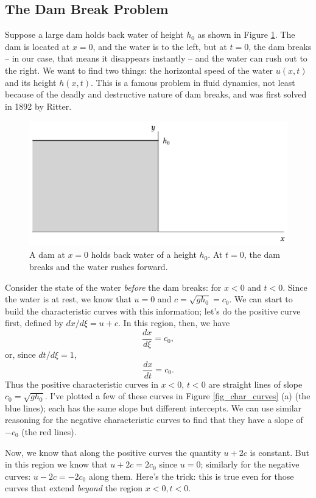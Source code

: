 \subsection{The Dam Break Problem}

Suppose a large dam holds back water of height $h_0$ as shown in Figure \ref{fig_dam_start}.  The dam is located at $x=0$, and the water is to the left, but at $t=0$, the dam breaks -- in our case, that means it disappears instantly -- and the water can rush out to the right.  We want to find two things: the horizontal speed of the water $u(x, t)$ and its height $h(x, t)$.  This is a famous problem in fluid dynamics, not least because of the deadly and destructive nature of dam breaks, and was first solved in 1892 by Ritter.

\begin{figure}
\centering
\includegraphics[width=0.9\linewidth]{Figures/Chapter6/fig_dam_start}
\caption{A dam at $x=0$ holds back water of a height $h_0$.  At $t=0$, the dam breaks and the water rushes forward.}
\label{fig_dam_start}
\end{figure}

Consider the state of the water \emph{before} the dam breaks:  for $x<0$ and $t<0$.  Since the water is at rest, we know that $u = 0$ and $c = \sqrt{gh_0} = c_0$.  We can start to build the characteristic curves with this information; let's do the positive curve first, defined by $dx/d\xi = u+c$.  In this region, then, we have
\[
\frac{dx}{d\xi} = c_0,
\]
or, since $dt/d\xi = 1$, 
\[
\frac{dx}{dt} = c_0.
\]
Thus the positive characteristic curves in $x<0$, $t<0$ are straight lines of slope $c_0 = \sqrt{gh_0}$.  I've plotted a few of these curves in Figure \ref{fig_char_curves} (a) (the blue lines); each has the same slope but different intercepts.  We can use similar reasoning for the negative characteristic curves to find that they have a slope of $-c_0$ (the red lines).

Now, we know that along the positive curves the quantity $u + 2c$ is constant.  But in this region we know that $u + 2c = 2c_0$ since $u=0$; similarly for the negative curves: $u - 2c = -2c_0$ along them.  Here's the trick: this is true even for those curves that extend \emph{beyond} the region $x<0, t<0$.

